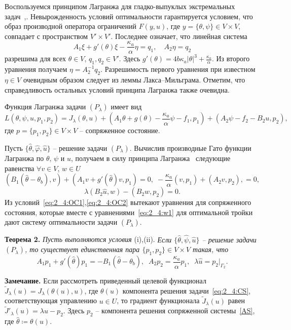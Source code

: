 Воспользуемся принципом
Лагранжа для гладко-выпуклых экстремальных задач~\cite{10},\cite{11}.
Невырожденность условий оптимальности гарантируется условием, что
образ производной
оператора ограничений $F(y, u)$, где $y=\{\theta,\psi\}\in V\times V$,
совпадает с пространством $V'\times V'.$  Последнее означает, что
линейная система
\[
    A_1\xi+g'(\theta)\xi-\frac{\kappa_a}{\alpha}\eta = q_1,\quad
    A_2\eta = q_2
\]
разрешима для всех $\theta\in V$, $q_1,q_2\in V'$.
Здесь $g'(\theta)=4b\kappa_a|\theta|^3+\frac{\kappa_a}{\alpha}$.
Из второго уравнения получаем $\eta = A_2^{-1}q_2$.
Разрешимость первого уравнения при известном $\eta\in V$
очевидным образом следует из леммы Лакса--Мильграма.
Отметим, что справедливость остальных условий принципа Лагранжа также очевидна.

Функция Лагранжа задачи $(P_\lambda)$
имеет вид
\[
    L(\theta, \psi, u, p_1, p_2) = J_\lambda(\theta, u)
    + (A_1\theta+g(\theta)-\frac{\kappa_a}{\alpha}\psi-f_1 ,p_1)+
    (A_2\psi-f_2-B_2u,p_2),
\]
где $p=\{p_1,p_2\}\in V\times V$ -- сопряженное состояние.

Пусть $\{\hat{\theta}, \hat{\varphi}, \hat{u} \}$ -- решение задачи $(P_\lambda)$.
Вычислив производные Гато функции Лагранжа по $\theta,\,\psi$ и $u$, получаем
в силу принципа Лагранжа~\cite[Теорема 1.5]{10} следующие равенства
$\forall v\in V,\, w\in U$
\begin{equation}
    \label{eq:2_4:OC1}
    (B_1(\hat{\theta} -\theta_b), v) + (A_1v+g'(\hat{\theta})v,p_1)=0,\;
    -\frac{\kappa_a}{\alpha}(v ,p_1)+
    (A_2v,p_2),    = 0,
\end{equation}
\begin{equation}
    \label{eq:2_4:OC2}
    \lambda(B_2\hat{u},w) - (B_2w, p_2) = 0.
\end{equation}
Из условий~\eqref{eq:2_4:OC1},\eqref{eq:2_4:OC2} вытекают уравнения для сопряженного состояния,
которые вместе с уравнениями~\eqref{eq:2_4:w1}
для оптимальной тройки дают систему оптимальности задачи $(P_\lambda)$.

\textbf{Теорема 2.}
\textit{ Пусть выполняются условия} (i),(ii).
\textit{ Если $\{\hat{\theta}, \hat{\psi}, \hat{u}\}$ -- решение
задачи $(P_\lambda)$, то существует единственная пара $\{p_1, p_2 \} \in V\times V$ такая, что}
\begin{equation}
    \label{eq:2_4:AS}
    A_1 p_1+g'(\hat{\theta}) p_1=-B_1(\hat{\theta} -\theta_b),\;\;
    A_2 p_2=\frac{\kappa_a}{\alpha}p_1,\;\;
    \lambda\hat{u}=p_2|_{\Gamma_2}.
\end{equation}

\textbf{Замечание.} Если рассмотреть приведенный целевой функционал
$\tilde J_\lambda(u)=J_\lambda(\theta(u), u)$, где $\theta(u)$ компонента решения
задачи~\eqref{eq:2_4:CS}, соответствующая управлению $u\in U$,
то градиент функционала $\tilde J_\lambda(u)$ равен $ \tilde J'_\lambda (u) = \lambda u - p_2. $
Здесь $p_2$ -- компонента решения сопряженной системы~\eqref{AS},
где $\hat{\theta}\coloneqq\theta(u)$.


